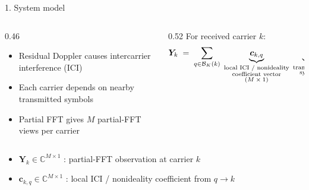 \documentclass[aspectratio=169,10pt]{beamer}
\newcommand{\vY}{\bm{Y}}
\newcommand{\vc}{\bm{c}}
\newcommand{\vn}{\bm{n}}
\newcommand{\Cx}{\mathbb{C}}
\newcommand{\Bk}{\mathcal{B}_K(k)}
\begin{document}
\begin{frame}{1. System model}

  \begin{columns}[T,onlytextwidth]
    \begin{column}{0.46\textwidth}
      \begin{itemize}\setlength{\itemsep}{0.5em}
        \item Residual Doppler causes intercarrier interference (ICI)
        \item Each carrier depends on nearby transmitted symbols
        \item Partial FFT gives $M$ partial-FFT views per carrier
      \end{itemize}
    \end{column}
    \begin{column}{0.52\textwidth}
      For received carrier $k$:
      \vspace{-0.2em}
      \[
        \vY_k \;=\;
        \sum_{q\in\Bk}\;
        \underbrace{\vc_{k,q}}_{\substack{\text{\scriptsize local ICI / nonideality}\\\text{\scriptsize coefficient vector}\\\text{\scriptsize $(M\times 1)$}}}\;
        \underbrace{s_q}_{\substack{\text{\scriptsize transmitted}\\\text{\scriptsize symbol}}}\;+\;
        \underbrace{\vn_k}_{\substack{\text{\scriptsize noise}\\\text{\scriptsize vector}}}
      \]
    \end{column}
  \end{columns}

  \vspace{0.5em}
  \begin{itemize}\setlength{\itemsep}{0.2em}
    \item $\vY_{k}\in\Cx^{M\times 1}$ : partial-FFT observation at carrier $k$
    \item $\vc_{k,q}\in\Cx^{M\times 1}$ : local ICI / nonideality coefficient from $q\to k$
  \end{itemize}

  \vspace{0.4em}
  \begin{center}
\end{center}
\end{frame}
\end{document}
